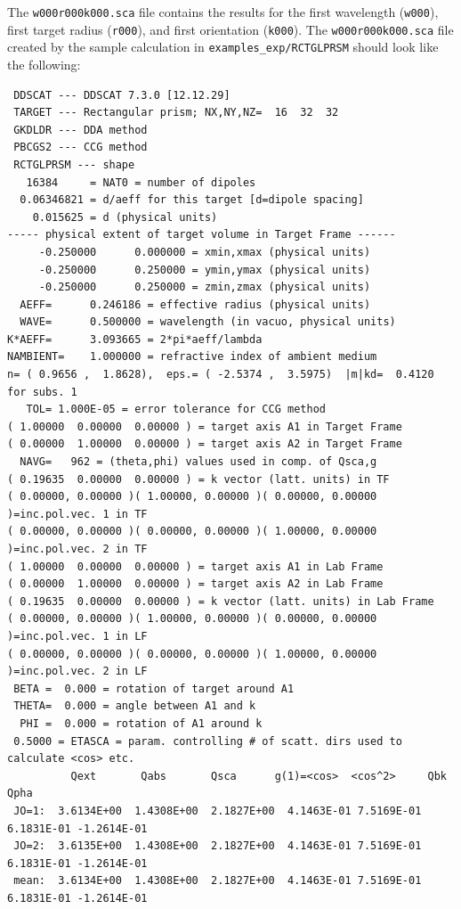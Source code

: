 \begin{appendix}
The {\tt w000r000k000.sca} file contains the results for the first
wavelength ({\tt w000}), first target radius ({\tt r000}),
and first orientation ({\tt k000}).
The {\tt w000r000k000.sca} file created by the sample calculation 
in {\tt examples\_exp/RCTGLPRSM} should look
like the following:
{\scriptsize
\begin{verbatim}
 DDSCAT --- DDSCAT 7.3.0 [12.12.29]   
 TARGET --- Rectangular prism; NX,NY,NZ=  16  32  32                          
 GKDLDR --- DDA method
 PBCGS2 --- CCG method
 RCTGLPRSM --- shape 
   16384     = NAT0 = number of dipoles
  0.06346821 = d/aeff for this target [d=dipole spacing]
    0.015625 = d (physical units)
----- physical extent of target volume in Target Frame ------
     -0.250000      0.000000 = xmin,xmax (physical units)
     -0.250000      0.250000 = ymin,ymax (physical units)
     -0.250000      0.250000 = zmin,zmax (physical units)
  AEFF=      0.246186 = effective radius (physical units)
  WAVE=      0.500000 = wavelength (in vacuo, physical units)
K*AEFF=      3.093665 = 2*pi*aeff/lambda
NAMBIENT=    1.000000 = refractive index of ambient medium
n= ( 0.9656 ,  1.8628),  eps.= ( -2.5374 ,  3.5975)  |m|kd=  0.4120 for subs. 1
   TOL= 1.000E-05 = error tolerance for CCG method
( 1.00000  0.00000  0.00000 ) = target axis A1 in Target Frame
( 0.00000  1.00000  0.00000 ) = target axis A2 in Target Frame
  NAVG=   962 = (theta,phi) values used in comp. of Qsca,g
( 0.19635  0.00000  0.00000 ) = k vector (latt. units) in TF
( 0.00000, 0.00000 )( 1.00000, 0.00000 )( 0.00000, 0.00000 )=inc.pol.vec. 1 in TF
( 0.00000, 0.00000 )( 0.00000, 0.00000 )( 1.00000, 0.00000 )=inc.pol.vec. 2 in TF
( 1.00000  0.00000  0.00000 ) = target axis A1 in Lab Frame
( 0.00000  1.00000  0.00000 ) = target axis A2 in Lab Frame
( 0.19635  0.00000  0.00000 ) = k vector (latt. units) in Lab Frame
( 0.00000, 0.00000 )( 1.00000, 0.00000 )( 0.00000, 0.00000 )=inc.pol.vec. 1 in LF
( 0.00000, 0.00000 )( 0.00000, 0.00000 )( 1.00000, 0.00000 )=inc.pol.vec. 2 in LF
 BETA =  0.000 = rotation of target around A1
 THETA=  0.000 = angle between A1 and k
  PHI =  0.000 = rotation of A1 around k
 0.5000 = ETASCA = param. controlling # of scatt. dirs used to calculate <cos> etc.
          Qext       Qabs       Qsca      g(1)=<cos>  <cos^2>     Qbk       Qpha
 JO=1:  3.6134E+00  1.4308E+00  2.1827E+00  4.1463E-01 7.5169E-01 6.1831E-01 -1.2614E-01
 JO=2:  3.6135E+00  1.4308E+00  2.1827E+00  4.1463E-01 7.5169E-01 6.1831E-01 -1.2614E-01
 mean:  3.6134E+00  1.4308E+00  2.1827E+00  4.1463E-01 7.5169E-01 6.1831E-01 -1.2614E-01

\end{verbatim}}
\end{appendix}

